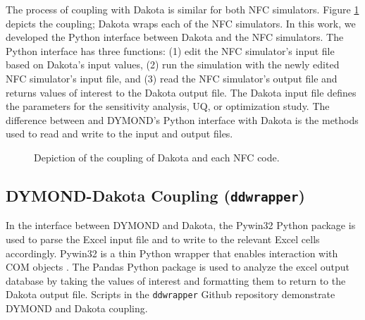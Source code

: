 The process of coupling with Dakota is similar 
for both \gls{NFC} simulators. 
Figure \ref{fig:dakota-NFC-flow} depicts the coupling; 
Dakota wraps each of the \gls{NFC} simulators.
In this work, we developed the Python interface between 
Dakota and the \gls{NFC} simulators.
The Python interface has three functions: 
(1) edit the \gls{NFC} simulator's input file based on Dakota's input values, 
(2) run the simulation with the newly edited \gls{NFC} simulator's input file, and 
(3) read the \gls{NFC} simulator's output file and returns values of interest 
to the Dakota output file. 
The Dakota input file defines the parameters for the sensitivity analysis, \gls{UQ}, or 
optimization study.
The difference between \Cyclus and DYMOND's Python interface with Dakota is the
methods used to read and write to the input and output files. 

\begin{figure}[]
    \centering
    \caption{Depiction of the coupling of Dakota and each NFC code.}
    \label{fig:dakota-NFC-flow}
\end{figure}

\subsection{DYMOND-Dakota Coupling (\texttt{ddwrapper})}
In the interface between DYMOND and Dakota, the Pywin32 
\cite{hammond_python_2000}
Python package is used to parse the Excel input file and to 
write to the relevant Excel cells accordingly. 
Pywin32 is a thin Python wrapper that enables interaction 
with COM objects \cite{hammond_python_2000}. 
The Pandas \cite{mckinney_pandas:_2011} Python
package is used to analyze the excel output database 
by taking the values of interest and formatting them 
to return to the Dakota output file.
Scripts in the \texttt{ddwrapper} Github repository \cite{chee_gwenchee/ddwrapper_2019}
demonstrate DYMOND and Dakota coupling. 

